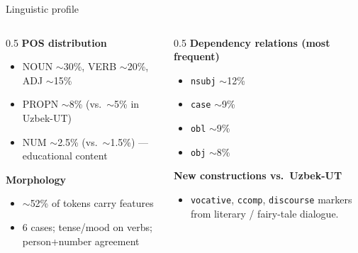 \documentclass[10pt,aspectratio=169]{beamer}
\begin{document}
\begin{frame}{Linguistic profile}
   \begin{columns}[T,onlytextwidth]
     \begin{column}{0.5\textwidth}
       \textbf{POS distribution}
       \begin{itemize}\small
         \item NOUN $\sim$30\%, VERB $\sim$20\%, ADJ $\sim$15\%
         \item PROPN $\sim$8\% (vs.\ $\sim$5\% in Uzbek-UT)
         \item NUM $\sim$2.5\% (vs.\ $\sim$1.5\%) — educational content
       \end{itemize}
       \vspace{0.4em}
       \textbf{Morphology}
       \begin{itemize}\small
         \item $\sim$52\% of tokens carry features
         \item 6 cases; tense/mood on verbs; person+number agreement
       \end{itemize}
     \end{column}
     \begin{column}{0.5\textwidth}
       \textbf{Dependency relations (most frequent)}
       \begin{itemize}\small
         \item \texttt{nsubj} $\sim$12\%
         \item \texttt{case}  $\sim$9\%
         \item \texttt{obl}   $\sim$9\%
         \item \texttt{obj}   $\sim$8\%
       \end{itemize}
       \vspace{0.4em}
       \textbf{New constructions vs.\ Uzbek-UT}
       \begin{itemize}\small
         \item \texttt{vocative}, \texttt{ccomp}, \texttt{discourse} markers from literary / fairy-tale dialogue.
       \end{itemize}
     \end{column}
   \end{columns}
\end{frame}

\end{document}
